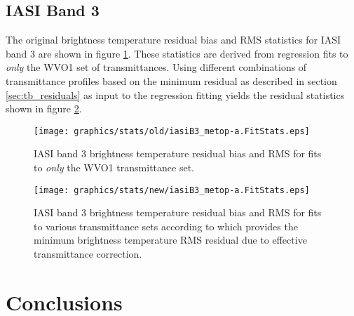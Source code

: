\subsection{IASI Band 3}
The original brightness temperature residual bias and RMS statistics for IASI band 3 are shown in figure \ref{fig:old_iasiB3_stats}. These statistics are derived from regression fits to \emph{only} the WVO1 set of transmittances. Using different combinations of transmittance profiles based on the minimum residual as described in section \ref{sec:tb_residuals} as input to the regression fitting yields the residual statistics shown in figure \ref{fig:new_iasiB3_stats}. 
\begin{figure}[htp]
  \centering
  \texttt{[image: graphics/stats/old/iasiB3\_metop-a.FitStats.eps]}
  \caption{IASI band 3 brightness temperature residual bias and RMS for fits to \emph{only} the WVO1 transmittance set.}
  \label{fig:old_iasiB3_stats}
\end{figure}
\begin{figure}[htp]
  \centering
  \texttt{[image: graphics/stats/new/iasiB3\_metop-a.FitStats.eps]}
  \caption{IASI band 3 brightness temperature residual bias and RMS for fits to various transmittance sets according to which provides the minimum brightness temperature RMS residual due to effective transmittance correction.}
  \label{fig:new_iasiB3_stats}
\end{figure}



\section{Conclusions}




	


\begin{appendix}

  
  

\end{appendix}




